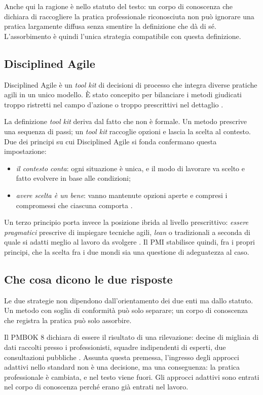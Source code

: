 Anche qui la ragione \`e nello statuto del testo: un corpo di
conoscenza che dichiara di raccogliere la pratica professionale riconosciuta non
pu\`o ignorare una pratica largamente diffusa senza smentire la definizione che
d\`a di s\'e. L'assorbimento \`e quindi l'unica strategia compatibile con questa 
definizione.

\subsection{Disciplined Agile}

Disciplined Agile \`e un \emph{tool kit} di decisioni di processo che integra
diverse pratiche agili in un unico modello. \`E stato concepito per bilanciare i
metodi giudicati troppo ristretti nel campo d'azione o troppo prescrittivi nel
dettaglio \cite{agilepracticeguide2}.

La definizione \emph{tool kit} deriva dal fatto che non \`e formale.
Un metodo prescrive una
sequenza di passi; un \emph{tool kit} raccoglie opzioni e lascia la scelta al
contesto. 
Due dei principi su cui Disciplined Agile si fonda confermano questa
impostazione:
\begin{itemize}
\item \emph{il contesto conta}: ogni situazione è unica, e il modo di lavorare
va scelto e fatto evolvere in base alle condizioni;
\item \emph{avere scelta è un bene}: vanno mantenute opzioni aperte e compresi
i compromessi che ciascuna comporta \cite{agilepracticeguide2}.
\end{itemize}

Un terzo principio porta invece la posizione ibrida al
livello prescrittivo: \emph{essere pragmatici} prescrive di impiegare
tecniche agili, \emph{lean} o tradizionali a seconda di quale si adatti meglio
al lavoro da svolgere \cite{agilepracticeguide2}. Il PMI stabilisce
quindi, fra i propri principi, che la scelta fra i due mondi sia una questione di
adeguatezza al caso.


\subsection{Che cosa dicono le due risposte}

Le due strategie non dipendono dall'orientamento dei due enti ma dallo statuto.
Un metodo con soglia
di conformit\`a pu\`o solo separare; un corpo di conoscenza che registra la
pratica pu\`o solo assorbire.

Il PMBOK 8 dichiara di essere il
risultato di una rilevazione: decine di migliaia di dati raccolti presso i
professionisti, squadre indipendenti di esperti, due consultazioni pubbliche
\cite{pmbok8}. Assunta questa premessa, l'ingresso degli approcci adattivi
nello standard non \`e una decisione, ma una conseguenza: la pratica
professionale \`e cambiata, e nel testo viene fuori.
Gli approcci adattivi sono entrati nel corpo di
conoscenza perch\'e erano gi\`a entrati nel lavoro.

